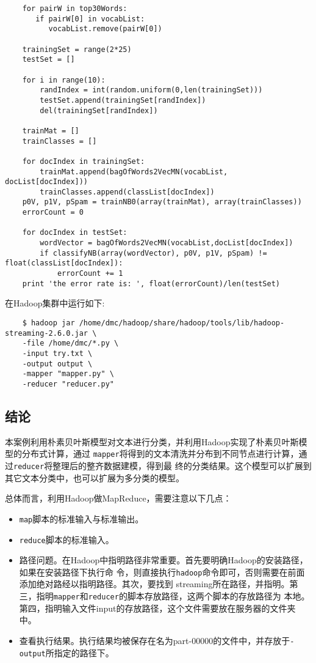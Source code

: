 \begin{lstlisting}
	for pairW in top30Words:
	   if pairW[0] in vocabList:
	      vocabList.remove(pairW[0])

	trainingSet = range(2*25)
	testSet = []

	for i in range(10):
	    randIndex = int(random.uniform(0,len(trainingSet)))
	    testSet.append(trainingSet[randIndex])
	    del(trainingSet[randIndex])

	trainMat = []
	trainClasses = []

	for docIndex in trainingSet:
	    trainMat.append(bagOfWords2VecMN(vocabList, docList[docIndex]))
	    trainClasses.append(classList[docIndex])
	p0V, p1V, pSpam = trainNB0(array(trainMat), array(trainClasses))
	errorCount = 0

	for docIndex in testSet:
	    wordVector = bagOfWords2VecMN(vocabList,docList[docIndex])
	    if classifyNB(array(wordVector), p0V, p1V, pSpam) != float(classList[docIndex]):
	        errorCount += 1
	print 'the error rate is: ', float(errorCount)/len(testSet)
\end{lstlisting}
在Hadoop集群中运行如下:

\begin{lstlisting}
	$ hadoop jar /home/dmc/hadoop/share/hadoop/tools/lib/hadoop-streaming-2.6.0.jar \
	-file /home/dmc/*.py \
	-input try.txt \
	-output output \
	-mapper "mapper.py" \
	-reducer "reducer.py"
\end{lstlisting}
\subsection{结论}\label{ux7ed3ux8bba}

本案例利用朴素贝叶斯模型对文本进行分类，并利用Hadoop实现了朴素贝叶斯模型的分布式计算，通过
\lstinline|mapper|将得到的文本清洗并分布到不同节点进行计算，通过\lstinline|reducer|将整理后的整齐数据建模，得到最
终的分类结果。这个模型可以扩展到其它文本分类中，也可以扩展为多分类的模型。

总体而言，利用Hadoop做MapReduce，需要注意以下几点：

\begin{itemize}
\item
  \lstinline|map|脚本的标准输入与标准输出。
\item
  \lstinline|reduce|脚本的标准输入。
\item
  路径问题。在Hadoop中指明路径非常重要。首先要明确Hadoop的安装路径，如果在安装路径下执行命
  令，则直接执行\texttt{hadoop}命令即可，否则需要在前面添加绝对路经以指明路径。其次，要找到
  streaming所在路径，并指明。第三，指明\lstinline|mapper|和\lstinline|reducer|的脚本存放路径，这两个脚本的存放路径为
  本地。第四，指明输入文件input的存放路径，这个文件需要放在服务器的文件夹中。
\item
  查看执行结果。执行结果均被保存在名为part-00000的文件中，并存放于\lstinline|-output|所指定的路径下。
\end{itemize}
